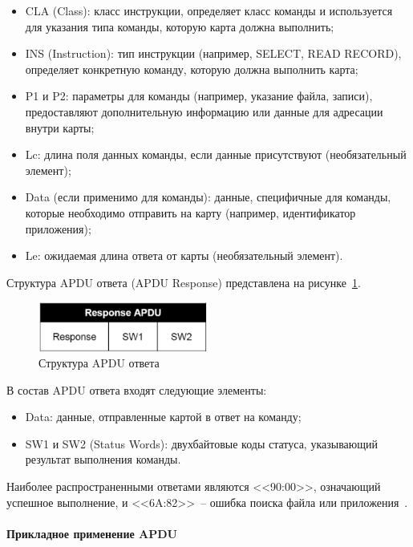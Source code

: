 \begin{itemize}
    \item CLA (Class): класс инструкции, определяет класс команды и используется для указания типа команды, которую карта должна выполнить;
    \item INS (Instruction): тип инструкции (например, SELECT, READ RECORD), определяет конкретную команду, которую должна выполнить карта;
    \item P1 и P2: параметры для команды (например, указание файла, записи), предоставляют дополнительную информацию или данные для адресации внутри карты;
    \item Lc: длина поля данных команды, если данные присутствуют (необязательный элемент);
    \item  Data (если применимо для команды): данные, специфичные для команды, которые необходимо отправить на карту (например, идентификатор приложения);
    \item Le: ожидаемая длина ответа от карты (необязательный элемент).
\end{itemize}


Структура APDU ответа (APDU Response) представлена на рисунке~\ref{fig:apdu_resp}.

\begin{figure}[H]
    \centering
    \includegraphics[width=0.5\textwidth]{images/research/apdu_resp}
    \caption{\centering Структура APDU ответа}
    \label{fig:apdu_resp}
\end{figure}

В состав APDU ответа входят следующие элементы:

\begin{itemize}
    \item Data: данные, отправленные картой в ответ на команду;
    \item SW1 и SW2 (Status Words): двухбайтовые коды статуса, указывающий результат выполнения команды.
\end{itemize}

Наиболее распространенными ответами являются <<90:00>>, означающий успешное выполнение, и <<6A:82>>~-- ошибка поиска файла или приложения~\cite{apdu_resp}.


\paragraph{Прикладное применение APDU}

